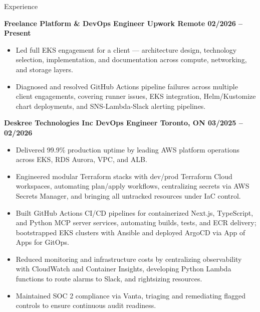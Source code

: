 \documentclass{resume}
\begin{document}
\begin{rSection}{Experience}

\textbf{Freelance Platform \& DevOps Engineer \textbar{} Upwork \textbar{} Remote \hfill 02/2026 -- Present}
\begin{itemize}
    \itemsep -3pt {}
    \item Led full EKS engagement for a client — architecture design, technology selection, implementation, and documentation across compute, networking, and storage layers.
    \item Diagnosed and resolved GitHub Actions pipeline failures across multiple client engagements, covering runner issues, EKS integration, Helm/Kustomize chart deployments, and SNS-Lambda-Slack alerting pipelines.
\end{itemize}

\textbf{Deskree Technologies Inc \textbar{} DevOps Engineer \textbar{} Toronto, ON \hfill 03/2025 -- 02/2026}
\begin{itemize}
    \itemsep -3pt {}
    \item Delivered 99.9\% production uptime by leading AWS platform operations across EKS, RDS Aurora, VPC, and ALB.
    \item Engineered modular Terraform stacks with dev/prod Terraform Cloud workspaces, automating plan/apply workflows, centralizing secrets via AWS Secrets Manager, and bringing all untracked resources under IaC control.
    \item Built GitHub Actions CI/CD pipelines for containerized Next.js, TypeScript, and Python MCP server services, automating builds, tests, and ECR delivery; bootstrapped EKS clusters with Ansible and deployed ArgoCD via App of Apps for GitOps.
    \item Reduced monitoring and infrastructure costs by centralizing observability with CloudWatch and Container Insights, developing Python Lambda functions to route alarms to Slack, and rightsizing resources.
    \item Maintained SOC 2 compliance via Vanta, triaging and remediating flagged controls to ensure continuous audit readiness.
\end{itemize}


\end{rSection}
\end{document}
